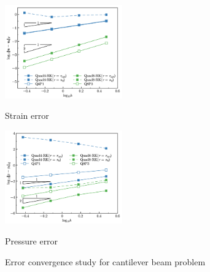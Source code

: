 \begin{figure}[H]
\centering
\begin{subcaptiongroup}
\centering
\parbox[b]{0.49\textwidth}{
    \DIFaddbeginFL \includegraphics[width=0.45\textwidth]{png/cantilever_Hdev_r1.png}
    \DIFaddendFL \caption{Strain error}\label{fg:cantilever_convergence_strain}
}
\parbox[b]{0.49\textwidth}{
    \DIFaddbeginFL \includegraphics[width=0.45\textwidth]{png/cantilever_L2_p_r1.png}
    \DIFaddendFL \caption{Pressure error}\label{fg:cantilever_convergence_pressure}
}
\end{subcaptiongroup}
\caption{Error convergence study for cantilever beam problem}\label{fg:cantilever_convergence}
\end{figure}


